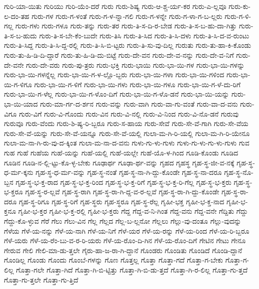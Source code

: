 {ಗುರಿ-ಯಾ-ಯಿತು
ಗುರಿಯು
ಗುರಿ-ಯೆಂ-ದರೆ
ಗುರು
ಗುರು-ಶಿಷ್ಯ
ಗುರು-ಆ-ಶ್ಚ-ರ್ಯ-ಕರ
ಗುರು-ಎ-ಲ್ಲವೂ
ಗುರು-ಕು-ಲ-ದಂ-ತಹ
ಗುರು-ಗಳ
ಗುರು-ಗ-ಳಂತೆ
ಗುರು-ಗ-ಳ-ನ್ನಾ-ಗಲಿ
ಗುರು-ಗ-ಳನ್ನೇ
ಗುರು-ಗ-ಳಾ-ಗ-ಬ-ಲ್ಲರು
ಗುರು-ಗ-ಳಿ-ಗಲ್ಲ
ಗುರು-ಗಳು
ಗುರು-ಗಳೂ
ಗುರು-ತನ್ನು
ಗುರು-ತರ
ಗುರು-ತಿ-ಸ-ದಿ-ರ-ಬೇಡ
ಗುರು-ತಿ-ಸ-ಬ-ಹು-ದಾ-ಗಿತ್ತು
ಗುರು-ತಿ-ಸ-ಬ-ಹುದು
ಗುರು-ತಿ-ಸ-ಬೇ-ಕೆಂ-ಬುದೇ
ಗುರು-ತಿಸಿ
ಗುರು-ತಿ-ಸಿದ
ಗುರು-ತಿ-ಸಿ-ದಳು
ಗುರು-ತಿ-ಸಿ-ದ-ವ-ರುಂಟು
ಗುರು-ತಿ-ಸಿದ್ದ
ಗುರು-ತಿ-ಸಿ-ದ್ದ-ರಲ್ಲಿ
ಗುರು-ತಿ-ಸಿ-ಬಿ-ಟ್ಟರು
ಗುರು-ತಿ-ಸು-ವು-ದಿಲ್ಲ
ಗುರುತು
ಗುರು-ತು-ಹಾ-ಕಿ-ಕೊಂಡು
ಗುರು-ತು-ಹಿ-ಡಿ-ದಿ-ದ್ದಾರೆ
ಗುರು-ತು-ಹಿ-ಡಿ-ದು-ಬಿಟ್ಟೆ
ಗುರು-ದೇ-ವನ
ಗುರು-ದೇ-ವ-ನನ್ನು
ಗುರು-ದೇ-ವ-ನಿಗೆ
ಗುರು-ದೇ-ವನೇ
ಗುರು-ದೇ-ವರು
ಗುರು-ಪು-ತ್ರರು
ಗುರು-ಭಕ್ತಿ
ಗುರು-ಭಾಯಿ
ಗುರು-ಭಾ-ಯಿ-ಗಳ
ಗುರು-ಭಾ-ಯಿ-ಗಳನ್ನು
ಗುರು-ಭಾ-ಯಿ-ಗಳನ್ನೆಲ್ಲ
ಗುರು-ಭಾ-ಯಿ-ಗ-ಳ-ಲ್ಲೊ-ಬ್ಬರು
ಗುರು-ಭಾ-ಯಿ-ಗಳಾ
ಗುರು-ಭಾ-ಯಿ-ಗಳಿಂದ
ಗುರು-ಭಾ-ಯಿ-ಗ-ಳಿಗೂ
ಗುರು-ಭಾ-ಯಿ-ಗ-ಳಿಗೆ
ಗುರು-ಭಾ-ಯಿ-ಗಳು
ಗುರು-ಭಾ-ಯಿ-ಗಳೂ
ಗುರು-ಭಾ-ಯಿ-ಗ-ಳೆ-ದು-ರಿಗೆ
ಗುರು-ಭಾ-ಯಿ-ಗ-ಳೆಲ್ಲ
ಗುರು-ಭಾ-ಯಿ-ಗ-ಳೊಂ-ದಿಗೆ
ಗುರು-ಭಾ-ಯಿ-ಗ-ಳೊ-ಡನೆ
ಗುರು-ಭಾ-ಯಿ-ಯನ್ನು
ಗುರು-ಭಾ-ಯಿ-ಯಾದ
ಗುರು-ಮಾ-ರ್ಗ-ದ-ರ್ಶನ
ಗುರು-ವನ್ನು
ಗುರು-ವಾಗಿ
ಗುರು-ವಾ-ಗು-ವಂತೆ
ಗುರು-ವಾ-ದ-ವನು
ಗುರು-ವಿಗೂ
ಗುರು-ವಿಗೆ
ಗುರು-ವಿ-ಗೊಂದು
ಗುರು-ವಿನ
ಗುರು-ವಿ-ನಲ್ಲಿ
ಗುರು-ವಿ-ನಿಂದ
ಗುರು-ವಿ-ನೊ-ಡನೆ
ಗುರುವು
ಗುರುವೂ
ಗುರು-ವೆಂದು
ಗುರು-ಶಿ-ಷ್ಯ-ರಿ-ಬ್ಬರೂ
ಗುರು-ಸ-ಹಾಯ
ಗುರು-ಸೇವೆ
ಗುರು-ಸೇ-ವೆ-ಗಾಗಿ
ಗುರು-ಸೇ-ವೆಯ
ಗುರು-ಸೇ-ವೆ-ಯನ್ನು
ಗುರು-ಸೇ-ವೆ-ಯನ್ನೂ
ಗುರು-ಸೇ-ವೆ-ಯಲ್ಲಿ
ಗುಲಾ-ಮ-ಗಿ-ರಿ-ಯಲ್ಲಿ
ಗುಲಾ-ಮ-ಗಿ-ರಿ-ಯೇನೂ
ಗುಲಾ-ಮ-ನಾ-ಗಿ-ರು-ವು-ದ-ಕ್ಕಿಂತ
ಗುಲಾ-ಮ-ನಾ-ದ-ವನು
ಗುಳು-ಗು-ಳು-ಗುಳು
ಗುಳು-ಗು-ಳು-ಗು-ಳು-ಗುಳು
ಗುವ
ಗುಹ
ಗುಹೆ
ಗುಹೆಯ
ಗುಹೆ-ಯನ್ನು
ಗುಹೆ-ಯಲ್ಲಿ
ಗುಹೆ-ಯಲ್ಲೇ
ಗುಹೆ-ಯೊ-ಳ-ಗಿಂದ
ಗೂಡಿ-ಕೊಂಡು
ಗೂಡಿದ
ಗೂಡಿನ
ಗೂಡಿ-ನ-ಲ್ಲಿ-ಟ್ಟು-ಕೊ-ಳ್ಳ-ಬೇಕು
ಗೂಢಾರ್ಥ
ಗೂಢಾ-ರ್ಥ-ವನ್ನು
ಗೃಹದ
ಗೃಹಸ್ಥ
ಗೃಹ-ಸ್ಥ-ಜೀ-ವ-ನಕ್ಕೆ
ಗೃಹ-ಸ್ಥ-ಧ-ರ್ಮ-ಕ್ಕನು
ಗೃಹ-ಸ್ಥ-ಧ-ರ್ಮ-ವನ್ನು
ಗೃಹ-ಸ್ಥ-ನಂತೆ
ಗೃಹ-ಸ್ಥ-ನಾ-ಗಿ-ದ್ದು-ಕೊಂಡೇ
ಗೃಹ-ಸ್ಥ-ನಾ-ದರೂ
ಗೃಹ-ಸ್ಥ-ನೊ-ಬ್ಬನ
ಗೃಹ-ಸ್ಥ-ಭ-ಕ್ತ-ರಾದ
ಗೃಹ-ಸ್ಥ-ಭ-ಕ್ತ-ರಿಂದ
ಗೃಹ-ಸ್ಥ-ಭ-ಕ್ತ-ರಿಗೆ
ಗೃಹ-ಸ್ಥ-ಭ-ಕ್ತ-ರಿ-ಗೆಲ್ಲ
ಗೃಹ-ಸ್ಥ-ಭ-ಕ್ತರು
ಗೃಹ-ಸ್ಥ-ಭ-ಕ್ತರೂ
ಗೃಹ-ಸ್ಥ-ರ-ಲ್ಲವೆ
ಗೃಹ-ಸ್ಥ-ರಾಗಿ
ಗೃಹ-ಸ್ಥ-ರಾ-ಗಿ-ದ್ದ-ವ-ರ-ಲ್ಲವೆ
ಗೃಹ-ಸ್ಥ-ರಾ-ಗಿ-ದ್ದು-ಕೊಂಡೇ
ಗೃಹ-ಸ್ಥ-ರಾ-ದರೂ
ಗೃಹ-ಸ್ಥ-ರಿಗೂ
ಗೃಹ-ಸ್ಥ-ರಿಗೆ
ಗೃಹ-ಸ್ಥರು
ಗೃಹ-ಸ್ಥರೂ
ಗೃಹ-ಸ್ಥ-ರೆಲ್ಲ
ಗೃಹೀ-ಭಕ್ತ
ಗೃಹೀ-ಭ-ಕ್ತ-ನಾದ
ಗೃಹೀ-ಭ-ಕ್ತನೂ
ಗೃಹೀ-ಭ-ಕ್ತರ
ಗೃಹೀ-ಭ-ಕ್ತ-ರಲ್ಲಿ
ಗೃಹೀ-ಭ-ಕ್ತರು
ಗೆದ್ದ
ಗೆದ್ದ-ವ-ನಿ-ಗಿಂತ
ಗೆದ್ದ-ವನು
ಗೆದ್ದ-ವನೇ
ಗೆದ್ದಿತು
ಗೆದ್ದು
ಗೆದ್ದು-ಕೊ-ಳ್ಳುವ
ಗೆರೆ
ಗೆಲು
ಗೆಲು-ವಿನ
ಗೆಲ್ಲ
ಗೆಲ್ಲದ
ಗೆಲ್ಲ-ಬ-ಲ್ಲನೋ
ಗೆಲ್ಲಲು
ಗೆಲ್ಲು-ವು-ದಂತೂ
ಗೆಲ್ಲು-ವುದನ್ನು
ಗೆಳೆಯ
ಗೆಳೆ-ಯ-ನನ್ನು
ಗೆಳೆ-ಯ-ನಾಗಿ
ಗೆಳೆ-ಯ-ನಿಗೆ
ಗೆಳೆ-ಯರ
ಗೆಳೆ-ಯ-ರನ್ನು
ಗೆಳೆ-ಯ-ರಿಂದ
ಗೆಳೆ-ಯ-ರಿ-ಬ್ಬರೂ
ಗೆಳೆ-ಯರು
ಗೆಳೆ-ಯ-ರೆಂ-ಬು-ವ-ರ-ರಿ-ಯರು
ಗೆಳೆ-ಯ-ರೊಂ-ದಿ-ಗಿನ
ಗೆಳೆ-ಯ-ರೊಂ-ದಿಗೆ
ಗೇಟಿನ
ಗೇಟು
ಗೇನೂ
ಗೇರುವ
ಗೇಲಿ
ಗೇಲಿ-ಮಾ-ಡು-ತ್ತಲೇ
ಗೈರು-ಹಾ-ಜ-ರಾ-ಗಿ-ದ್ದಾನೆ
ಗೊಂಡರು
ಗೊಂಡಿತು
ಗೊಂಡಿದೆ
ಗೊಂಡಿ-ದ್ದಾನೆ
ಗೊಂಡಿಲ್ಲ
ಗೊಂಡು
ಗೊಂದು
ಗೊಂಬೆ-ಗಳನ್ನು
ಗೊಣ
ಗೊತ್ತಲ್ಲ
ಗೊತ್ತಾ
ಗೊತ್ತಾ-ಗದೆ
ಗೊತ್ತಾ-ಗ-ಬೇಕು
ಗೊತ್ತಾ-ಗ-ಲಿಲ್ಲ
ಗೊತ್ತಾ-ಗಲೇ
ಗೊತ್ತಾ-ಗಿದೆ
ಗೊತ್ತಾ-ಗಿ-ಬಿ-ಟ್ಟಿತ್ತು
ಗೊತ್ತಾ-ಗಿ-ಬಿ-ಡು-ತ್ತದೆ
ಗೊತ್ತಾ-ಗಿ-ರ-ಲಿಲ್ಲ
ಗೊತ್ತಾ-ಗು-ತ್ತದೆ
ಗೊತ್ತಾ-ಗು-ತ್ತಲೇ
ಗೊತ್ತಾ-ಗು-ತ್ತಿದೆ
}
